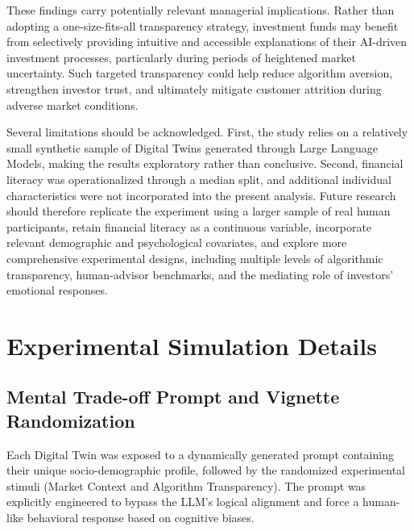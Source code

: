 \documentclass[10pt, a4paper]{article} %
\begin{document}
These findings carry potentially relevant managerial implications. Rather than adopting a one-size-fits-all transparency strategy, investment funds may benefit from selectively providing intuitive and accessible explanations of their AI-driven investment processes, particularly during periods of heightened market uncertainty. Such targeted transparency could help reduce algorithm aversion, strengthen investor trust, and ultimately mitigate customer attrition during adverse market conditions.

Several limitations should be acknowledged. First, the study relies on a relatively small synthetic sample of Digital Twins generated through Large Language Models, making the results exploratory rather than conclusive. Second, financial literacy was operationalized through a median split, and additional individual characteristics were not incorporated into the present analysis. Future research should therefore replicate the experiment using a larger sample of real human participants, retain financial literacy as a continuous variable, incorporate relevant demographic and psychological covariates, and explore more comprehensive experimental designs, including multiple levels of algorithmic transparency, human-advisor benchmarks, and the mediating role of investors' emotional responses.

\clearpage




\newpage
\appendix
\section{Experimental Simulation Details}

\subsection{Mental Trade-off Prompt and Vignette Randomization}
Each Digital Twin was exposed to a dynamically generated prompt containing their unique socio-demographic profile, followed by the randomized experimental stimuli (Market Context and Algorithm Transparency). The prompt was explicitly engineered to bypass the LLM's logical alignment and force a human-like behavioral response based on cognitive biases.
\end{document}
